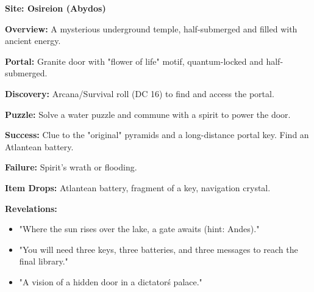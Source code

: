 \documentclass[12pt]{article}
\begin{document}
\textbf{Site: Osireion (Abydos)}

\textbf{Overview:}  
A mysterious underground temple, half-submerged and filled with ancient energy.

\textbf{Portal:}  
Granite door with "flower of life" motif, quantum-locked and half-submerged.

\textbf{Discovery:}  
Arcana/Survival roll (DC 16) to find and access the portal.

\textbf{Puzzle:}  
Solve a water puzzle and commune with a spirit to power the door.

\textbf{Success:}  
Clue to the "original" pyramids and a long-distance portal key. Find an Atlantean battery.

\textbf{Failure:}  
Spirit's wrath or flooding.

\textbf{Item Drops:}  
Atlantean battery, fragment of a key, navigation crystal.

\textbf{Revelations:}
\begin{itemize}
  \item "Where the sun rises over the lake, a gate awaits (hint: Andes)."
  \item "You will need three keys, three batteries, and three messages to reach the final library."
  \item "A vision of a hidden door in a dictator\'s palace."
\end{itemize}
\end{document}
